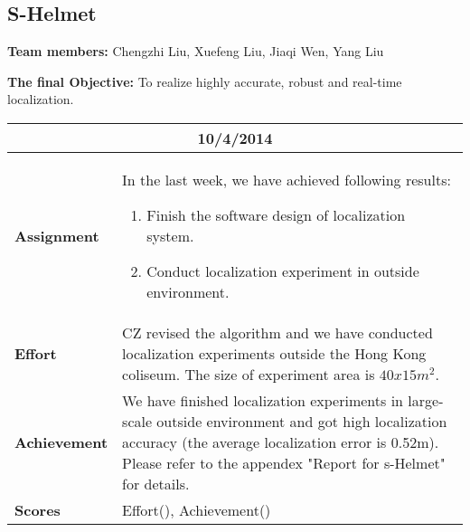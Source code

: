 \subsection{S-Helmet}

\textbf{Team members:}
Chengzhi Liu, Xuefeng Liu, Jiaqi Wen, Yang Liu 

\textbf{The final Objective:}
To realize highly accurate, robust and real-time localization.

\begin{longtable}{|p{2.5cm}|p{13cm}|}
\hline
\multicolumn{2}{|c|}{10/4/2014}\\
\hline
\textbf{Assignment}&{In the last week, we have achieved following results:
 \begin{enumerate}
    \item Finish the software design of localization system.
    \item Conduct localization experiment in outside environment.
  \end{enumerate}
}\\
\hline
\textbf{Effort}&{CZ revised the algorithm and we have conducted localization experiments outside the Hong Kong coliseum. The size of experiment area is \(40x15m^2\).}\\
\hline
\textbf{Achievement}&{We have finished localization experiments in large-scale outside environment and got high localization accuracy (the average localization error is 0.52m). Please refer to the appendex "Report for s-Helmet" for details.}\\
\hline
\textbf{Scores}&{Effort(), Achievement()}\\
\hline
\end{longtable}



